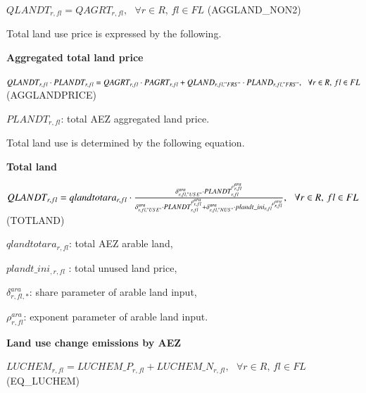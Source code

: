 \documentclass[10pt,a4paper,titlepage,dvipdfmx]{book}
\begin{document}
\begin{center}$QLANDT_{r,fl}=QAGRT_{r,fl},\,\,\,\,\forall r\in R,\,fl\in FL$ (AGGLAND\_NON2)
\end{center}

Total land use price is expressed by the following.

\begin{flushleft}\textbf{Aggregated total land price}\end{flushleft}


\begin{center}$QLANDT_{r,fl}\cdot PLANDT_{r,fl}=QAGRT_{r,fl}\cdot PAGRT_{r,fl}+QLAND_{r,fl,"FRS"}\cdot PLAND_{r,fl,"FRS"},\,\,\,\,\forall r\in R,\,fl\in FL$ (AGGLANDPRICE)
\end{center}

\begin{flushleft}$PLANDT_{r,fl}$: total AEZ aggregated land price. \end{flushleft}

Total land use is determined by the following equation.

\begin{flushleft}\textbf{Total land}\end{flushleft}


\begin{center}$QLANDT_{r,fl}=qlandtotara_{r,fl}\cdot \frac{\delta _{r,fl,"USE"}^{ara}\cdot PLANDT_{r,fl}^{\rho _{r,fl}^{ara}}}{\delta _{r,fl,"USE"}^{ara}\cdot PLANDT_{r,fl}^{\rho _{r,fl}^{ara}}+\delta _{r,fl,"NUS"}^{ara}\cdot plandt\_ in{i_{r,fl}}^{\rho _{r,fl}^{ara}}},\,\,\,\,\forall r\in R,\,fl\in FL$ (TOTLAND)
\end{center}

\begin{flushleft}
$qlandtotara_{r,fl}$: total AEZ arable land,

$plandt\_ini_{, r,fl}$ : total unused land price,

$\delta _{r,fl,*}^{ara}$: share parameter of arable land input,

$\rho _{r,fl}^{ara}$: exponent parameter of arable land input.
\end{flushleft}

\begin{flushleft}\textbf{Land use change emissions by AEZ}\end{flushleft}


\begin{center}$LUCHEM_{r,fl}=LUCHEM\_ P_{r,fl}+LUCHEM\_ N_{r,fl},\,\,\,\,\forall r\in R,\,fl\in FL$ (EQ\_LUCHEM)
\end{center}
\end{document}
